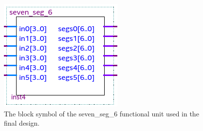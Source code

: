 \documentclass[a4paper]{article}
\begin{document}
\begin{figure}[h]
\centering
\includegraphics[width=.88\textwidth]{functional_units/seven_seg_6/seven_seg_6_symbol.png}
\caption{The block symbol of the seven\_seg\_6 functional unit used in the final design.}
\end{figure}
\end{document}
